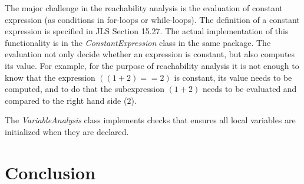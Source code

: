 \documentclass[a4paper, notitlepage]{report}
\begin{document}
The major challenge in the reachability analysis is the evaluation of constant expression (as conditions in for-loops or while-loops). The definition of a constant expression is specified in JLS Section 15.27. The actual implementation of this functionality is in the \emph{ConstantExpression} class in the same package. The evaluation not only decide whether an expression is constant, but also computes its value. For example, for the purpose of reachability analysis it is not enough to know that the expression $((1+2) == 2)$  is constant, its value needs to be computed, and to do that the subexpression $(1+2)$ needs to be evaluated and compared to the right hand side ($2$).

The \emph{VariableAnalysis} class implements checks that ensures all local variables are initialized when they are declared.
 










\chapter{Conclusion}



\end{document}
